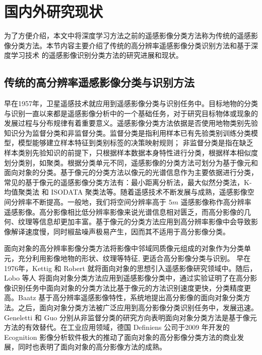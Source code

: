 \section{国内外研究现状}
\label{sec:second}
为了方便介绍，本文中将深度学习方法之前的遥感影像分类方法称为传统的遥感影像分类方法。本节内容主要介绍了传统的高分辨率遥感影像分类识别方法和基于深度学习技术\citep{hinton2006fast, bengio2009learning, NIPS2012_4824} 的遥感影像识别分类方法的研究进展和现状。

\subsection{传统的高分辨率遥感影像分类与识别方法}
\label{subsec:1-2-1}
早在1957年，卫星遥感技术就应用到遥感影像分类与识别任务中。目标地物的分类与识别一直以来都是遥感影像分析中的一个基础任务，对于研究目标物体或现象的发展过程与分布规律有着重要意义\cite{jensen1987introductory}。遥感影像分类方法依据是否使用地物类别先验知识分为监督分类和非监督分类。监督分类是指利用样本已有先验类别训练分类模型，模型能够建立样本特征到类别标签的决策映射规则； 非监督分类是指在缺乏样本类别先验知识的前提下，只根据样本数据本身特性进行分类，根据样本相似度划分类别，如聚类\cite{djukanovic1993unsupervised}。根据分类单元不同，遥感影像的分类方法可划分为基于像元和面向对象的分类。基于像元的分类方法以像元的光谱信息作为主要依据进行分类，常见的基于像元的遥感影像分类方法有：最小距离分析法\cite{wacker1972minimum}，最大似然分类法\cite{strahler1980use}，K-均值聚类法\cite{atkinson2000geostatistical} 和 ISODATA 聚类法\cite{paul2002new}等。随着遥感技术不断发展与成熟，遥感影像空间分辨率不断提高。一般地，我们将空间分辨率高于 $5m$ 遥感影像称作高分辨率遥感影像\cite{zhangyongsheng2004}。高分影像相比低分辨率影像来说光谱信息相对匮乏，而高分影像的几何、纹理等信息却更加丰富。基于像元的分类方法应用到高分辨率影像中会导致影像解译速度慢，同时椒盐噪声极易产生，因而其不适用于高分影像分类\cite{blaschke2010object}。

面向对象的高分辨率影像分类方法将影像中邻域同质像元组成的对象作为分类单元，充分利用影像地物的形状、纹理等特征, 更适合高分影像分类与识别\cite{zhangyongsheng2004}。 早在1976年，Kettig 和 Robert \cite{kettig1976classification} 就将面向对象的思想引入遥感影像研究领域中。随后，Lobo 等人 \cite{lobo1996classification} 将面向对象分类方法应用到遥感影像分类中，通过实验证明了在高分影像识别任务中面向对象的分类方法比基于像元的方法识别速度更快，分类精度更高。Baatz \cite{baatz1999object} 基于高分辨率遥感影像特性，系统地提出高分影像的面向对象分类方法。之后，面向对象分类方法被广泛应用到高分影像分类识别任务中，发展迅速。 Geneletti \cite{geneletti2003method} 和 Guo \cite{guo2007object} 分别从非监督分类的研究方向表明面向对象分类方法是基于像元方法的有效替代。在工业应用领域，德国 Definiens 公司于2009 年开发的 Ecognition 影像分析软件极大的推动了面向对象的高分影像分类方法的商业发展，同时也表明了面向对象的高分影像方法的成熟。

